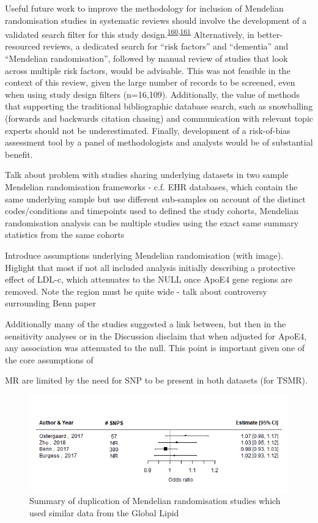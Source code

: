\documentclass[a4paper, twoside]{templates/ociamthesis}
\begin{document}
Useful future work to improve the methodology for inclusion of Mendelian randomisation studies in systematic reviews should involve the development of a validated search filter for this study design.\textsuperscript{\protect\hyperlink{ref-waffenschmidt2020}{160},\protect\hyperlink{ref-wagner2020}{161}} Alternatively, in better-resourced reviews, a dedicated search for ``risk factors'' and ``dementia'' and ``Mendelian randomisation'', followed by manual review of studies that look across multiple risk factors, would be advisable. This was not feasible in the context of this review, given the large number of records to be screened, even when using study design filters (n=16,109). Additionally, the value of methods that supporting the traditional bibliographic database search, such as snowballing (forwards and backwards citation chasing) and communication with relevant topic experts should not be underestimated. Finally, development of a risk-of-bias assessment tool by a panel of methodologists and analysts would be of substantial benefit.

Talk about problem with studies sharing underlying datasets in two sample Mendelian randomisation frameworks - c.f. EHR databases, which contain the same underlying sample but use different sub-samples on account of the distinct codes/conditions and timepoints used to defined the study cohorts, Mendelian randomisation analysis can be multiple studies using the exact same summary statistics from the same cohorts

Introduce assumptions underlying Mendelian randomisation (with image). Higlight that most if not all included analysis initially describing a protective effect of LDL-c, which attenuates to the NULL once ApoE4 gene regions are removed. Note the region must be quite wide - talk about controversy surrounding Benn paper

Additionally many of the studies suggested a link between, but then in the sensitivity analyses or in the Discussion disclaim that when adjusted for ApoE4, any association was attenuated to the null. This point is important given one of the core assumptions of

MR are limited by the need for SNP to be present in both datasets (for TSMR).





\begin{figure}[H]
\includegraphics[width=1\linewidth]{figures/sys-rev/mrDuplication} \caption[Summary of duplication of Mendelian randomisation studies]{Summary of duplication of Mendelian randomisation studies which used similar data from the Global Lipid}\label{fig:mrDuplication}
\end{figure}
\end{document}
